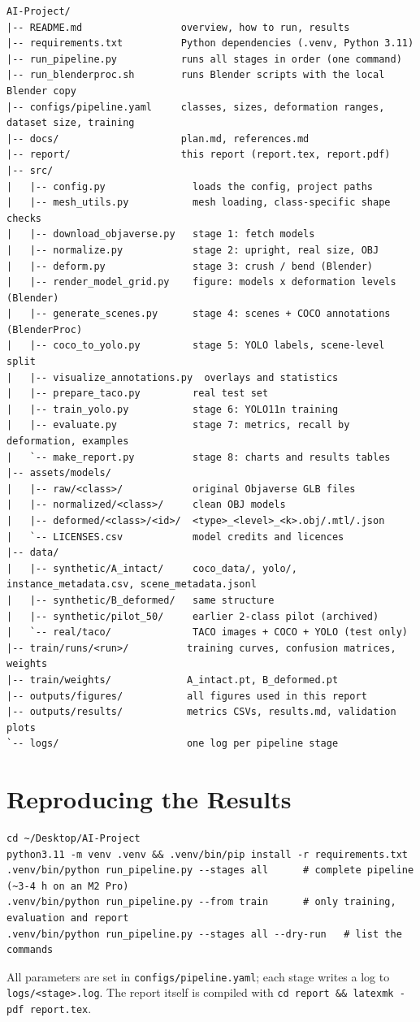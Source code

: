 \documentclass[11pt,a4paper]{article}
\newcommand{\code}[1]{\texttt{\small #1}}
\begin{document}
\begin{lstlisting}
AI-Project/
|-- README.md                 overview, how to run, results
|-- requirements.txt          Python dependencies (.venv, Python 3.11)
|-- run_pipeline.py           runs all stages in order (one command)
|-- run_blenderproc.sh        runs Blender scripts with the local Blender copy
|-- configs/pipeline.yaml     classes, sizes, deformation ranges, dataset size, training
|-- docs/                     plan.md, references.md
|-- report/                   this report (report.tex, report.pdf)
|-- src/
|   |-- config.py               loads the config, project paths
|   |-- mesh_utils.py           mesh loading, class-specific shape checks
|   |-- download_objaverse.py   stage 1: fetch models
|   |-- normalize.py            stage 2: upright, real size, OBJ
|   |-- deform.py               stage 3: crush / bend (Blender)
|   |-- render_model_grid.py    figure: models x deformation levels (Blender)
|   |-- generate_scenes.py      stage 4: scenes + COCO annotations (BlenderProc)
|   |-- coco_to_yolo.py         stage 5: YOLO labels, scene-level split
|   |-- visualize_annotations.py  overlays and statistics
|   |-- prepare_taco.py         real test set
|   |-- train_yolo.py           stage 6: YOLO11n training
|   |-- evaluate.py             stage 7: metrics, recall by deformation, examples
|   `-- make_report.py          stage 8: charts and results tables
|-- assets/models/
|   |-- raw/<class>/            original Objaverse GLB files
|   |-- normalized/<class>/     clean OBJ models
|   |-- deformed/<class>/<id>/  <type>_<level>_<k>.obj/.mtl/.json
|   `-- LICENSES.csv            model credits and licences
|-- data/
|   |-- synthetic/A_intact/     coco_data/, yolo/, instance_metadata.csv, scene_metadata.jsonl
|   |-- synthetic/B_deformed/   same structure
|   |-- synthetic/pilot_50/     earlier 2-class pilot (archived)
|   `-- real/taco/              TACO images + COCO + YOLO (test only)
|-- train/runs/<run>/          training curves, confusion matrices, weights
|-- train/weights/             A_intact.pt, B_deformed.pt
|-- outputs/figures/           all figures used in this report
|-- outputs/results/           metrics CSVs, results.md, validation plots
`-- logs/                      one log per pipeline stage
\end{lstlisting}

\section{Reproducing the Results}

\begin{lstlisting}
cd ~/Desktop/AI-Project
python3.11 -m venv .venv && .venv/bin/pip install -r requirements.txt
.venv/bin/python run_pipeline.py --stages all      # complete pipeline (~3-4 h on an M2 Pro)
.venv/bin/python run_pipeline.py --from train      # only training, evaluation and report
.venv/bin/python run_pipeline.py --stages all --dry-run   # list the commands
\end{lstlisting}

All parameters are set in \code{configs/pipeline.yaml}; each stage writes a log to
\code{logs/<stage>.log}. The report itself is compiled with
\code{cd report \&\& latexmk -pdf report.tex}.
\end{document}

